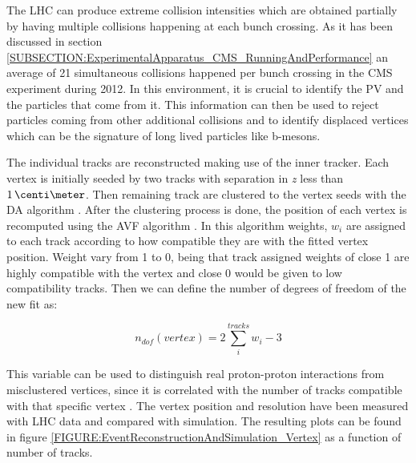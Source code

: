 
The \gls{LHC} can produce extreme collision intensities which are obtained partially by having multiple collisions happening at each bunch crossing. As it has been discussed in section \ref{SUBSECTION:ExperimentalApparatus_CMS_RunningAndPerformance} an average of 21 simultaneous collisions happened per bunch crossing in the \gls{CMS} experiment during 2012. In this environment, it is crucial to identify the \gls{PV} and the particles that come from it. This information can then be used to reject particles coming from other additional collisions and to identify displaced vertices which can be the signature of long lived particles like b-mesons.

The individual tracks are reconstructed making use of the inner tracker. Each vertex is initially seeded by two tracks with separation in \textit{z} less than $1\,\centi\meter$. Then remaining track are clustered to the vertex seeds with the \gls{DA} algorithm \cite{ARTICLE:DeterministicAnnealing}. After the clustering process is done, the position of each vertex is recomputed using the \gls{AVF} algorithm \cite{ARTICLE:AdaptiveVertexFitting}. In this algorithm weights, $w_{i}$ are assigned to each track according to how compatible they are with the fitted vertex position. Weight vary from 1 to 0, being that track assigned weights of close 1 are highly compatible with the vertex and close 0 would be given to low compatibility tracks. Then we can define the number of degrees of freedom of the new fit as:

\begin{equation}
n_{dof}(vertex)=2\sum\limits_{i}^{tracks} w_i - 3
\end{equation}

This variable can be used to distinguish real proton-proton interactions from misclustered vertices, since it is correlated with the number of tracks compatible with that specific vertex \cite{ARTICLE:CMSTrackingAndPrimaryVertex}. The vertex position and resolution have been measured with \gls{LHC} data and compared with simulation. The resulting plots can be found in figure \ref{FIGURE:EventReconstructionAndSimulation_Vertex} as a function of number of tracks.

